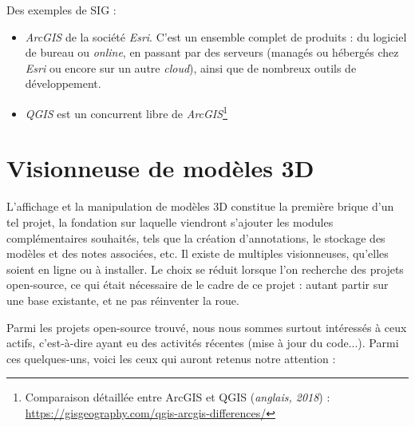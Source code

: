 Des exemples de SIG :

\begin{itemize}
    \item \textit{ArcGIS} de la société \textit{Esri}. C'est un ensemble complet de produits : du logiciel de bureau ou \textit{online}, en passant par des serveurs (managés ou hébergés chez \textit{Esri} ou encore sur un autre \textit{cloud}), ainsi que de nombreux outils de développement.
    \item \textit{QGIS} est un concurrent libre de \textit{ArcGIS}\footnote{Comparaison détaillée entre ArcGIS et QGIS (\textit{anglais, 2018}) : \url{https://gisgeography.com/qgis-arcgis-differences/}}
\end{itemize}

\section{Visionneuse de modèles 3D}

L'affichage et la manipulation de modèles 3D constitue la première brique d'un tel projet, la fondation sur laquelle viendront s'ajouter les modules complémentaires souhaités, tels que la création d'annotations, le stockage des modèles et des notes associées, etc.
Il existe de multiples visionneuses, qu'elles soient en ligne ou à installer. Le choix se réduit lorsque l'on recherche des projets open-source, ce qui était nécessaire de le cadre de ce projet : autant partir sur une base existante, et ne pas réinventer la roue.


Parmi les projets open-source trouvé, nous nous sommes surtout intéressés à ceux actifs, c'est-à-dire ayant eu des activités récentes (mise à jour du code...). Parmi ces quelques-uns, voici les ceux qui auront retenus notre attention :

